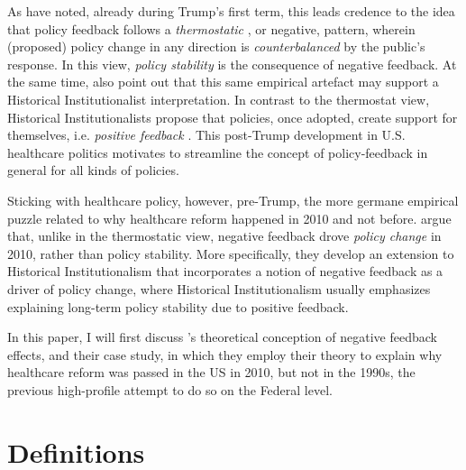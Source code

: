 \documentclass[11pt, xcolor=dvipsnames]{article}
\begin{document}
\begin{figure}[H]
    \sffamily
    
\end{figure}


\noindent As \textcite[][]{Busemeyer2019} have noted, already during Trump's first term, this leads credence to the idea that policy feedback follows a \textit{thermostatic} \parencite[][]{Wlezien1995}, or negative, pattern, wherein (proposed) policy change in any direction is \textit{counterbalanced} by the public's response. In this view, \textit{policy stability} is the consequence of negative feedback. At the same time, \textcite[][]{Busemeyer2019} also point out that this same empirical artefact may support a Historical Institutionalist interpretation. In contrast to the thermostat view, Historical Institutionalists propose that policies, once adopted, create support for themselves, i.e. \textit{positive feedback} \parencites[see e.g.][]{Pierson1993}{Pierson2000}. This post-Trump development in U.S. healthcare politics motivates \textcite[][]{Βusemeyer2019} to streamline the concept of policy-feedback in general for all kinds of policies.

Sticking with healthcare policy, however, pre-Trump, the more germane empirical puzzle related to why healthcare reform happened in 2010 and not before. \textcite[][]{Jacobs2014} argue that, unlike in the thermostatic view, negative feedback drove \textit{policy change} in 2010, rather than policy stability. More specifically, they develop an extension to Historical Institutionalism that incorporates a notion of negative feedback as a driver of policy change, where Historical Institutionalism usually emphasizes explaining long-term policy stability due to positive feedback. 

In this paper, I will first discuss \citeauthor[][]{Jacobs2014}'s \citeyear{Jacobs2014} theoretical conception of negative feedback effects, and their case study, in which they employ their theory to explain why healthcare reform was passed in the US in 2010, but not in the 1990s, the previous high-profile attempt to do so on the Federal level.


\section*{Definitions}
\end{document}
